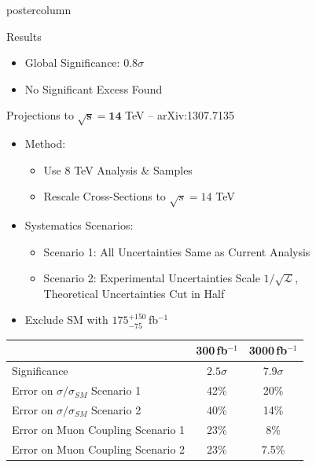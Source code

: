 \documentclass[final,hyperref={pdfpagelabels=false}]{beamer}
\newcommand{\fb}{\,fb$^{-1}$}
\begin{document}
\begin{frame}
\begin{columns}
\begin{column}{.49\textwidth}
\begin{beamercolorbox}[center,wd=\textwidth]{postercolumn}
\begin{minipage}[T]{.95\textwidth}
{\begin{block}{Results}
\begin{itemize}
                \item Global Significance: $0.8\sigma$
                \item No Significant Excess Found
              \end{itemize}
            \end{block}
            \vfill
            \begin{block}{Projections to $\mathbf{\sqrt{s}=14}$ TeV -- arXiv:1307.7135 }
               \begin{itemize} 
                  \item Method:
                  \begin{itemize} 
                    \item Use 8 TeV Analysis \& Samples 
                    \item Rescale Cross-Sections to $\sqrt{s}=14$ TeV
                  \end{itemize}
                  \item Systematics Scenarios:
                  \begin{itemize}
                    \item Scenario 1: All Uncertainties Same as Current Analysis
                    \item Scenario 2: Experimental Uncertainties Scale $1/\sqrt{\mathcal{L}}$, \\
                                      Theoretical Uncertainties Cut in Half
                  \end{itemize}
                  \item Exclude SM with $175^{+150}_{-75}$\fb
               \end{itemize}
               \begin{center}
                      \begin{tabular}{|l|c|c|} \hline
                          & 300\fb & 3000\fb \\ \hline
                        Significance  & $2.5\sigma$ & $7.9\sigma$ \\ \hline
                        Error on $\sigma/\sigma_{SM}$ Scenario 1  & 42\% & 20\% \\ \hline
                        Error on $\sigma/\sigma_{SM}$ Scenario 2  & 40\% & 14\% \\ \hline
                        Error on Muon Coupling Scenario 1  & 23\% & 8\% \\ \hline
                        Error on Muon Coupling Scenario 2  & 23\% & 7.5\% \\ \hline

\end{tabular}
\end{center}
\end{block}}
\end{minipage}
\end{beamercolorbox}
\end{column}
\end{columns}
\end{frame}
\end{document}
